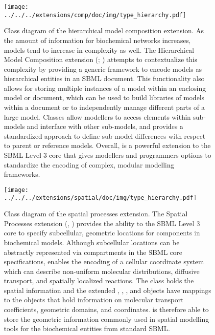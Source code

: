 \begin{figure}[H]
 \centering
\texttt{[image: ../../../extensions/comp/doc/img/type\_hierarchy.pdf]}
 \vspace*{-5em}
 \caption[Class diagram of the hierarchical model composition extension]{Class diagram of the hierarchical model composition extension. As the amount of information for biochemical networks increases, models tend to
increase in complexity as well. The Hierarchical Model Composition extension (; \cite{smith2010})
attempts to contextualize this complexity by providing a generic framework to encode
models as hierarchical entities in an SBML document. This functionality also allows
for storing multiple instances of a model within an enclosing model or document, which
can be used to build libraries of models within a document or to independently manage
different parts of a large model. Classes allow modellers to access elements within
sub-models and interface with other sub-models, and  provides a standardized approach
to define sub-model differences with respect to parent or reference models. Overall, 
is a powerful extension to the SBML Level 3 core that gives modellers and programmers
options to standardize the encoding of complex, modular modelling frameworks. 
}
 \label{fig:comp}
\end{figure}


\begin{figure}[H]
 \centering
\texttt{[image: ../../../extensions/spatial/doc/img/type\_hierarchy.pdf]}
 \vspace*{-2.5em}
 \caption[Class diagram of the spatial processes extension]{Class diagram of the spatial processes extension. The Spatial Processes extension (, \cite{Schaff2014})
provides the ability to the SBML Level 3 core to specify subcellular,
geometric locations for components in biochemical
models. Although subcellular locations can be abstractly represented via
compartments in the SBML core specifications,  enables the encoding of
a cellular coordinate system which can describe non-uniform molecular distributions,
diffusive transport, and spatially localized reactions. The  class holds
the spatial information and the extended , , , and
 objects have mappings to the  objects that hold information on
molecular transport coefficients, geometric domains, and coordinates.  is
therefore able to store the geometric information commonly used in spatial modelling
tools for the biochemical entities from standard SBML.}
 \label{fig:spatial}
\end{figure}


